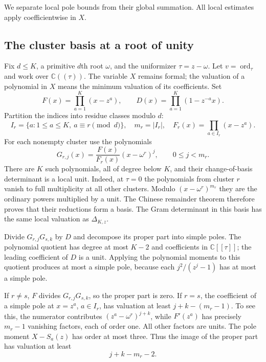 \documentclass[11pt,letterpaper]{article}
\numberwithin{equation}{section}
\theoremstyle{remark}
\newcommand{\C}{\mathbb C}
\newcommand{\ord}{\operatorname{ord}}
\begin{document}
We separate local pole bounds from their global summation. All local estimates apply coefficientwise in $X$.

\subsection{The cluster basis at a root of unity}

Fix $d\le K$, a primitive $d$th root $\omega$, and the uniformizer $\tau=z-\omega$. Let $v=\ord_\tau$ and work over $\C((\tau))$. The variable $X$ remains formal; the valuation of a polynomial in $X$ means the minimum valuation of its coefficients. Set
\begin{equation*}
 F(x)=\prod_{a=1}^K(x-z^a),\qquad
 D(x)=\prod_{a=1}^K(1-z^{-a}x).
\end{equation*}
Partition the indices into residue classes modulo $d$:
\begin{equation*}
 I_r=\{a:1\le a\le K,\ a\equiv r\pmod d\},\quad
 m_r=|I_r|,\quad F_r(x)=\prod_{a\in I_r}(x-z^a).
\end{equation*}
For each nonempty cluster use the polynomials
\begin{equation}\label{eq:cluster-basis}
 G_{r,j}(x)=\frac{F(x)}{F_r(x)}(x-\omega^r)^j,
 \qquad 0\le j<m_r.
\end{equation}
There are $K$ such polynomials, all of degree below $K$, and their change-of-basis determinant is a local unit. Indeed, at $\tau=0$ the polynomials from cluster $r$ vanish to full multiplicity at all other clusters. Modulo $(x-\omega^r)^{m_r}$ they are the ordinary powers multiplied by a unit. The Chinese remainder theorem therefore proves that their reductions form a basis. The Gram determinant in this basis has the same local valuation as $\Delta_{K,z}$.

Divide $G_{r,j}G_{s,k}$ by $D$ and decompose its proper part into simple poles. The polynomial quotient has degree at most $K-2$ and coefficients in $\C[[\tau]]$; the leading coefficient of $D$ is a unit. Applying the polynomial moments to this quotient produces at most a simple pole, because each $j^2/(z^j-1)$ has at most a simple pole.

If $r\ne s$, $F$ divides $G_{r,j}G_{s,k}$, so the proper part is zero. If $r=s$, the coefficient of a simple pole at $x=z^a$, $a\in I_r$, has valuation at least $j+k-(m_r-1)$. To see this, the numerator contributes $(z^a-\omega^r)^{j+k}$, while $F'(z^a)$ has precisely $m_r-1$ vanishing factors, each of order one. All other factors are units. The pole moment $X-S_a(z)$ has order at most three. Thus the image of the proper part has valuation at least
\begin{equation}\label{eq:pole-local}
 j+k-m_r-2.
\end{equation}
\end{document}
